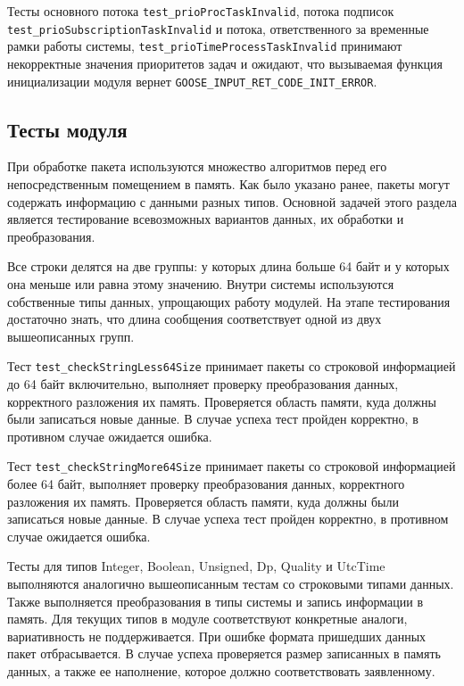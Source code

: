 Тесты основного потока \lstinline{test_prioProcTaskInvalid}, потока подписок  \lstinline{test_prioSubscriptionTaskInvalid} и потока, ответственного за временные рамки работы системы, \lstinline{test_prioTimeProcessTaskInvalid} принимают некорректные значения приоритетов задач и ожидают, что вызываемая функция инициализации модуля вернет \lstinline{GOOSE_INPUT_RET_CODE_INIT_ERROR}.

\subsection{Тесты модуля \moduleProcessPackets}

При обработке пакета используются множество алгоритмов перед его непосредственным помещением в память. Как было указано ранее, пакеты могут содержать информацию с данными разных типов. Основной задачей этого раздела является тестирование всевозможных вариантов данных, их обработки и преобразования.

Все строки делятся на две группы: у которых длина больше 64 байт и у которых она меньше или равна этому значению. Внутри системы используются собственные типы данных, упрощающих работу модулей. На этапе тестирования достаточно знать, что длина сообщения соответствует одной из двух вышеописанных групп.

Тест  \lstinline{test_checkStringLess64Size} принимает пакеты со строковой информацией до 64 байт включительно, выполняет проверку преобразования данных, корректного разложения их память. Проверяется область памяти, куда должны были записаться новые данные. В случае успеха тест пройден корректно, в противном случае ожидается ошибка.

Тест  \lstinline{test_checkStringMore64Size} принимает пакеты со строковой информацией более 64 байт, выполняет проверку преобразования данных, корректного разложения их память. Проверяется область памяти, куда должны были записаться новые данные. В случае успеха тест пройден корректно, в противном случае ожидается ошибка.

Тесты для типов Integer, Boolean, Unsigned,
Dp, Quality и UtcTime выполняются аналогично вышеописанным тестам со строковыми типами данных. Также выполняется преобразования в типы системы и запись информации в память. Для текущих типов в модуле соответствуют конкретные аналоги, вариативность не поддерживается. При ошибке формата пришедших данных пакет отбрасывается. В случае успеха проверяется размер записанных в память данных, а также ее наполнение, которое должно соответствовать заявленному.

